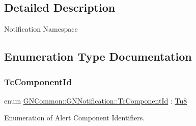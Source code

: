 \subsection{Detailed Description}
Notification Namespace 

\subsection{Enumeration Type Documentation}
\mbox{\label{namespace_g_n_common_1_1_g_n_notification_a24173724db4e769e5cf4bc03c70c34cd}} 
\subsubsection{\texorpdfstring{Tc\+Component\+Id}{TcComponentId}}
{\footnotesize\ttfamily enum \mbox{\hyperlink{namespace_g_n_common_1_1_g_n_notification_a24173724db4e769e5cf4bc03c70c34cd}{G\+N\+Common\+::\+G\+N\+Notification\+::\+Tc\+Component\+Id}} \+: \mbox{\hyperlink{namespace_g_n_common_a7939e251ddbf5d3a31832dcfdc8bde39}{Tu8}}\hspace{0.3cm}{\ttfamily [strong]}}



Enumeration of Alert Component Identifiers. 

